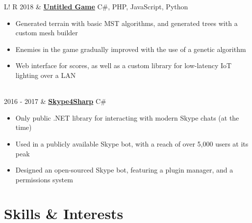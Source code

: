 \documentclass[10pt, a4paper]{article}
\newcommand\vsep{\color{lightgray} \vrule width 0.5pt}
\newcommand\sect[1]{\section*{\hspace{.05cm} \Large\sc #1}}
\newcommand\itemizespace{\vspace{-0.65\baselineskip}}
\newcommand\tspace{\hfill}
\begin{document}
\begin{tabular}{L!{\vsep}R}
                2018 & \href{https://github.com/lin-e/CSProject2017}{\textbf{Untitled Game}} \tspace C\#, PHP, JavaScript, Python
                    \begin{itemize}[label=\raisebox{0.25ex}{\tiny$\bullet$}]
                        \setlength{\itemindent}{-0.125in}
                        \item Generated terrain with basic MST algorithms, and generated trees with a custom mesh builder
                        \item Enemies in the game gradually improved with the use of a genetic algorithm
                        \item Web interface for scores, as well as a custom library for low-latency IoT lighting over a LAN
                        \itemizespace
                    \end{itemize} \\
                2016 - 2017 & \href{https://github.com/lin-e/Skype4Sharp}{\textbf{Skype4Sharp}} \tspace C\#
                    \begin{itemize}[label=\raisebox{0.25ex}{\tiny$\bullet$}]
                        \setlength{\itemindent}{-0.125in}
                        \item Only public .NET library for interacting with modern Skype chats (at the time)
                        \item Used in a publicly available Skype bot, with a reach of over 5,000 users at its peak
                        \item Designed an open-sourced Skype bot, featuring a plugin manager, and a permissions system
                        \vspace{-1.1\baselineskip}
                    \end{itemize}
            \end{tabular}
        \sect{Skills \& Interests}
\end{document}

